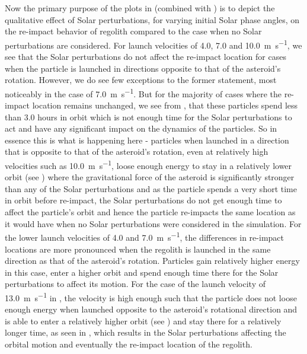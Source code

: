 Now the primary purpose of the plots in  (combined with ) is to depict the qualitative effect of Solar perturbations, for varying initial Solar phase angles, on the re-impact behavior of regolith compared to the case when no Solar perturbations are considered. For launch velocities of 4.0, 7.0 and \SI{10.0}{\metre\per\second}, we see that the Solar perturbations do not affect the re-impact location for cases when the particle is launched in directions opposite to that of the asteroid's rotation. However, we do see few exceptions to the former statement, most noticeably in the case of \SI{7.0}{\metre\per\second}. But for the majority of cases where the re-impact location remains unchanged, we see from , that these particles spend less than 3.0 hours in orbit which is not enough time for the Solar perturbations to act and have any significant impact on the dynamics of the particles. So in essence this is what is happening here - particles when launched in a direction that is opposite to that of the asteroid's rotation, even at relatively high velocities such as \SI{10.0}{\metre\per\second}, loose enough energy to stay in a relatively lower orbit (see ) where the gravitational force of the asteroid is significantly stronger than any of the Solar perturbations and as the particle spends a very short time in orbit before re-impact, the Solar perturbations do not get enough time to affect the particle's orbit and hence the particle re-impacts the same location as it would have when no Solar perturbations were considered in the simulation. For the lower launch velocities of 4.0 and \SI{7.0}{\metre\per\second}, the differences in re-impact locations are more pronounced when the regolith is launched in the same direction as that of the asteroid's rotation. Particles gain relatively higher energy in this case, enter a higher orbit and spend enough time there for the Solar perturbations to affect its motion. For the case of the launch velocity of \SI{13.0}{\metre\per\second} in , the velocity is high enough such that the particle does not loose enough energy when launched opposite to the asteroid's rotational direction and is able to enter a relatively higher orbit (see ) and stay there for a relatively longer time, as seen in , which results in the Solar perturbations affecting the orbital motion and eventually the re-impact location of the regolith.
